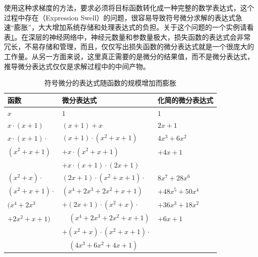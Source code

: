 \parinterval  使用这种求梯度的方法，要求必须将目标函数转化成一种完整的数学表达式，这个过程中存在{\small{}}（Expression Swell）的问题，很容易导致符号微分求解的表达式急速``膨胀''，大大增加系统存储和处理表达式的负担。关于这个问题的一个实例请看表\ref{tab:5-4}。在深层的神经网络中，神经元数量和参数量极大，损失函数的表达式会非常冗长，不易存储和管理，而且，仅仅写出损失函数的微分表达式就是一个很庞大的工作量。从另一方面来说，这里真正需要的是微分的结果值，而不是微分表达式，推导微分表达式仅仅是求解过程中的中间产物。

\begin{table}[htp]
\centering
\caption{符号微分的表达式随函数的规模增加而膨胀}
\label{tab:5-4}
\small
\begin{tabular}{l | l l}
\rule{0pt}{18pt}     函数 & 微分表达式 & 化简的微分表达式  \\
\hline
\rule{0pt}{18pt}     $x$ & $1$ & $1$ \\
\rule{0pt}{18pt}     $x\cdot(x+1)$ & $(x+1)+x$ & $2x + 1$ \\
\rule{0pt}{18pt}     $x\cdot(x+1)\cdot$ & $(x+1)\cdot(x^2+x+1)$ & $4x^3+6x^2$ \\
$(x^2+x+1)$ & $+x\cdot(x^2+x+1)$ & $+4x+1$ \\
                     & $+x\cdot(x+1)\cdot(2x+1)$ & \\
\rule{0pt}{18pt}     $(x^2+x)\cdot$ & $(2x+1)\cdot(x^2+x+1)\cdot$ & $8x^7+28x^6$ \\
$(x^2+x+1)\cdot$ & $(x^4+2x^3+2x^2+x+1)$ & $+48x^5+50x^4$ \\
$(x^4+2x^3$ & $+(2x+1)\cdot(x^2+x)\cdot$ & $+36x^3+18x^2$ \\
$+2x^2+x+1)$ & \ \ $(x^4+2x^3+2x^2+x+1)$ & $+6x+1$ \\
 & $+(x^2+x)\cdot(x^2+x+1)\cdot$ & \\
 & \ \ $(4x^3+6x^2+4x+1)$ & \\
\end{tabular}
\end{table}

%

\vspace{0.5em}
\vspace{0.5em}


